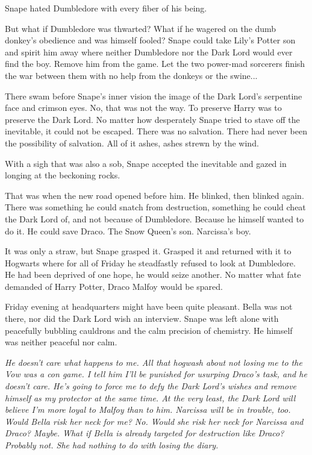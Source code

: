 Snape hated Dumbledore with every fiber of his being.

But what if Dumbledore was thwarted? What if he wagered on the dumb donkey's obedience and was himself fooled? Snape could take Lily's Potter son and spirit him away where neither Dumbledore nor the Dark Lord would ever find the boy. Remove him from the game. Let the two power-mad sorcerers finish the war between them with no help from the donkeys or the swine...

There swam before Snape's inner vision the image of the Dark Lord's serpentine face and crimson eyes. No, that was not the way. To preserve Harry was to preserve the Dark Lord. No matter how desperately Snape tried to stave off the inevitable, it could not be escaped. There was no salvation. There had never been the possibility of salvation. All of it ashes, ashes strewn by the wind.

With a sigh that was also a sob, Snape accepted the inevitable and gazed in longing at the beckoning rocks.

That was when the new road opened before him. He blinked, then blinked again. There was something he could snatch from destruction, something he could cheat the Dark Lord of, and not because of Dumbledore. Because he himself wanted to do it. He could save Draco. The Snow Queen's son. Narcissa's boy.

It was only a straw, but Snape grasped it. Grasped it and returned with it to Hogwarts where for all of Friday he steadfastly refused to look at Dumbledore. He had been deprived of one hope, he would seize another. No matter what fate demanded of Harry Potter, Draco Malfoy would be spared.

Friday evening at headquarters might have been quite pleasant. Bella was not there, nor did the Dark Lord wish an interview. Snape was left alone with peacefully bubbling cauldrons and the calm precision of chemistry. He himself was neither peaceful nor calm.

\emph{He doesn't care what happens to me. All that hogwash about not losing me to the Vow was a con game. I tell him I'll be punished for usurping Draco's task, and he doesn't care. He's going to force me to defy the Dark Lord's wishes and remove himself as my protector at the same time. At the very least, the Dark Lord will believe I'm more loyal to Malfoy than to him. Narcissa will be in trouble, too. Would Bella risk her neck for me? No. Would she risk her neck for Narcissa and Draco? Maybe. What if Bella is already targeted for destruction like Draco? Probably not. She had nothing to do with losing the diary.}

